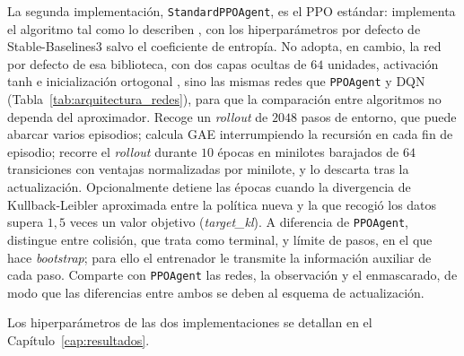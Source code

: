 La segunda implementación, \texttt{StandardPPOAgent}, es el PPO
estándar: implementa el algoritmo tal como lo describen
\citet{schulman2017proximal}, con los hiperparámetros por defecto de
Stable-Baselines3 \citep{raffin2021stable,raffin2024stableppo} salvo el
coeficiente de entropía. No adopta, en cambio, la red por defecto de esa
biblioteca, con dos capas ocultas de $64$ unidades, activación tanh e
inicialización ortogonal \citep{raffin2024stablepolicies}, sino las mismas
redes que \texttt{PPOAgent} y DQN (Tabla~\ref{tab:arquitectura_redes}),
para que la comparación entre algoritmos no dependa del aproximador. Recoge un \textit{rollout} de $2048$ pasos
de entorno, que puede abarcar varios episodios; calcula GAE
interrumpiendo la recursión en cada fin de episodio; recorre el
\textit{rollout} durante $10$ épocas en minilotes barajados de $64$
transiciones con ventajas normalizadas por minilote, y lo descarta tras
la actualización. Opcionalmente detiene las épocas cuando la divergencia
de Kullback-Leibler aproximada entre la política nueva y la que
recogió los datos supera $1{,}5$ veces un valor objetivo
(\textit{target\_kl}). A diferencia de \texttt{PPOAgent}, distingue
entre colisión, que trata como terminal, y límite de pasos, en el que
hace \textit{bootstrap}; para ello el entrenador le transmite la
información auxiliar de cada paso. Comparte con \texttt{PPOAgent} las
redes, la observación y el enmascarado, de modo que las diferencias
entre ambos se deben al esquema de actualización.

Los hiperparámetros de las dos implementaciones se detallan en el
Capítulo~\ref{cap:resultados}.

%
%
